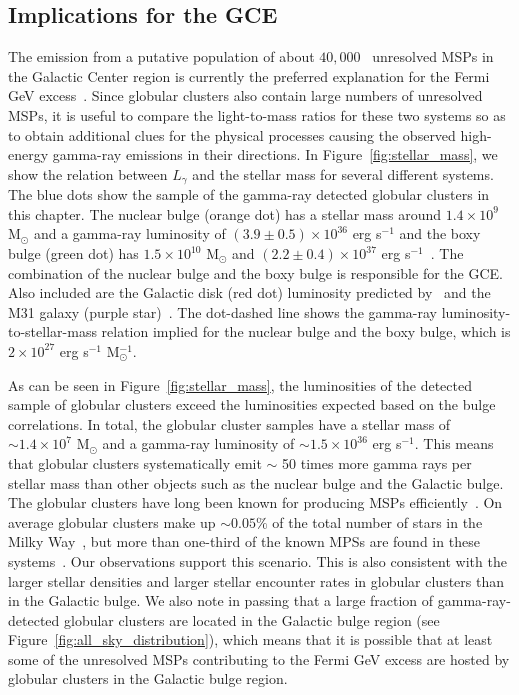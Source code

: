 \documentclass[doublespace,nopageskip]{VTthesis}
\begin{document}
\subsection{Implications for the GCE}

The emission from a putative population of about $40,000$~\citep{2020JCAP...12..035P} unresolved MSPs in the Galactic Center region is currently the preferred explanation for the Fermi GeV excess~\citep{2018NatAs...2..387M,2018NatAs...2..819B,2019JCAP...09..042M,2020PhRvD.102d3012A}. Since globular clusters also contain large numbers of unresolved MSPs, it is useful to compare the light-to-mass ratios for these two systems so as to obtain additional clues for the physical processes causing the observed high-energy gamma-ray emissions in their directions. In Figure~\ref{fig:stellar_mass}, we show the relation between $L_\gamma$ and the stellar mass for several different systems. The blue dots show the sample of the gamma-ray detected globular clusters in this chapter. The nuclear bulge (orange dot) has a stellar mass around $1.4\times 10^9$ M$_\odot$ and a gamma-ray luminosity of $(3.9\pm 0.5)\times 10^{36}$ erg s$^{-1}$ and the boxy bulge (green dot) has $1.5\times 10^{10}$ M$_\odot$ and $(2.2 \pm 0.4)\times 10^{37}$ erg s$^{-1}$~\citep{2019JCAP...09..042M}. The combination of the nuclear bulge and the boxy bulge is responsible for the GCE. Also included are the Galactic disk (red dot) luminosity predicted by~\citet{2018NatAs...2..819B} and the M31 galaxy (purple star)~\citep{2017ApJ...836..208A}. The dot-dashed line shows the gamma-ray luminosity-to-stellar-mass relation implied for the nuclear bulge and the boxy bulge, which is $2 \times 10^{27}$ erg s$^{-1}$ M$_\odot^{-1}$. 

As can be seen in Figure~\ref{fig:stellar_mass}, the luminosities of the detected sample of globular clusters exceed the luminosities expected based on the bulge correlations. In total, the globular cluster samples have a stellar mass of $\sim 1.4\times 10^7$ M$_\odot$ and a gamma-ray luminosity of $\sim 1.5\times 10^{36}$ erg s$^{-1}$. This means that globular clusters systematically emit $\sim$ 50 times more gamma rays per stellar mass than other objects such as the nuclear bulge and the Galactic bulge. The globular clusters have long been known for producing MSPs efficiently~\citep{2005ASPC..328..147C}. On average globular clusters make up $\sim 0.05\%$ of the total number of stars in the Milky Way~\citep{2019ApJ...877..122Y}, but more than one-third of the known MPSs are found in these systems~\citep{2005AJ....129.1993M}. Our observations support this scenario. This is also consistent with the larger stellar densities and larger stellar encounter rates in globular clusters than in the Galactic bulge. We also note in passing that a large fraction of gamma-ray-detected globular clusters are located in the Galactic bulge region (see Figure~\ref{fig:all_sky_distribution}), which means that it is possible that at least some of the unresolved MSPs contributing to the Fermi GeV excess are hosted by globular clusters in the Galactic bulge region.
\end{document}
